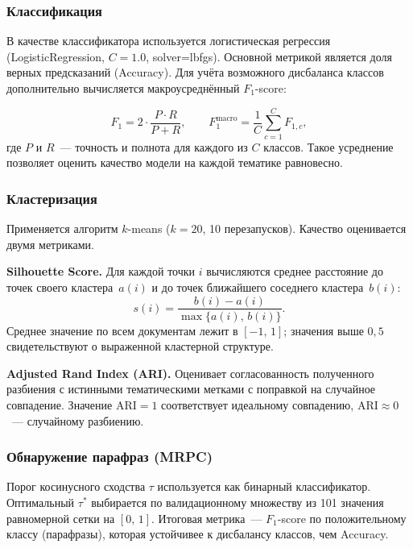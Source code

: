 \subsubsection{Классификация}

В качестве классификатора используется логистическая регрессия
(LogisticRegression, $C{=}1.0$, solver=lbfgs).
Основной метрикой является доля верных предсказаний (Accuracy). Для учёта
возможного дисбаланса классов дополнительно вычисляется макроусреднённый
$F_1$-score:

\begin{equation*}
  F_1 = 2 \cdot \frac{P \cdot R}{P + R},
  \qquad
  F_{1}^{\mathrm{macro}} = \frac{1}{C}\sum_{c=1}^{C} F_{1,c},
\end{equation*}
где $P$ и $R$~--- точность и полнота для каждого из $C$ классов.
Такое усреднение позволяет оценить качество модели на каждой тематике
равновесно.

\subsubsection{Кластеризация}

Применяется алгоритм $k$-means ($k = 20$, 10 перезапусков).
Качество оценивается двумя метриками.

\textbf{Silhouette Score.} Для каждой точки $i$ вычисляются среднее
расстояние до точек своего кластера~$a(i)$ и до точек ближайшего соседнего
кластера~$b(i)$:
\begin{equation*}
  \label{eq:silhouette}
  s(i) = \frac{b(i) - a(i)}{\max\{a(i),\, b(i)\}}.
\end{equation*}
Среднее значение по всем документам лежит в $[-1,\,1]$; значения выше $0{,}5$
свидетельствуют о выраженной кластерной структуре.

\textbf{Adjusted Rand Index (ARI).} Оценивает согласованность полученного
разбиения с истинными тематическими метками с поправкой на случайное
совпадение. Значение $\mathrm{ARI} = 1$ соответствует идеальному совпадению,
$\mathrm{ARI} \approx 0$~--- случайному разбиению.

\subsubsection{Обнаружение парафраз (MRPC)}

Порог косинусного сходства $\tau$ используется как бинарный классификатор.
Оптимальный $\tau^{*}$ выбирается по валидационному множеству из 101 значения
равномерной сетки на $[0,\,1]$. Итоговая метрика~--- $F_1$-score по
положительному классу (парафразы), которая устойчивее к дисбалансу классов,
чем Accuracy.
